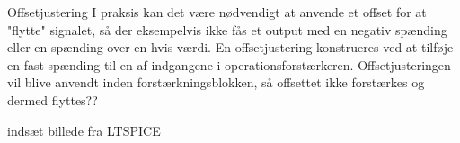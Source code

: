Offsetjustering 
I praksis kan det være nødvendigt at anvende et offset for at "flytte" signalet, så der eksempelvis ikke fås et output med en negativ spænding eller en spænding over en hvis værdi. En offsetjustering konstrueres ved at tilføje en fast spænding til en af indgangene i operationsforstærkeren. Offsetjusteringen vil blive anvendt inden forstærkningsblokken, så offsettet ikke forstærkes og dermed flyttes??

indsæt billede fra LTSPICE